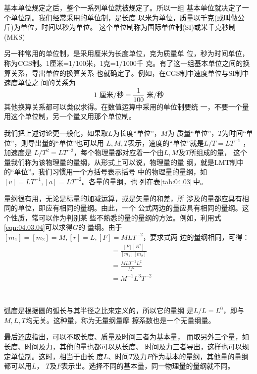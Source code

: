 基本单位规定之后，整个一系列单位就被规定了。所以一组
基本单位就决定了一个单位制。我们经常采用的单位制，是长度
以米为单位，质量以千克(或叫做公斤)为单位，时间以秒为单位。
这个单位制称为国际单位制(SI)或米千克秒制(MKS)

另一种常用的单位制，是采用厘米为长度单位，克为质量单
位，秒为时间单位，称为CGS制。1厘米=1/100米，1克=1/1000千
克。有了这一组基本单位之间的换算关系，导出单位的换算关系
也就确定了。例如，在CGS制中速度单位与SI制中速度单位之
间的关系为
\begin{equation*}
  1 \text{ 厘米/秒} = \frac { 1 } { 1 0 0 } \text{ 米/秒}
\end{equation*}
其他换算关系都可以类似求得。在数值运算中采用的单位制要统
\clearpage\noindent
一，不要一个量用这个单位制，另一个量又用那个单位制。

我们把上述讨论更一般化，如果取$ L $为长度“单位”，$ M $为
质量“单位”，$ T $为时间“单位”，则导出量的“单位”也可以用
$ L , M , T $表示，速度的“单位”就是$ L / T = L T ^ { - 1 } $ ，加速度是
$ L / T ^ { 2 } = L T ^ { - 2 } $，每个物理量都对应着一个由$ L , M $及$ T $所组成的量，
这个量我们称为该物理量的量纲，从形式上可以说，物理量的量
纲，就是LMT制中的“单位”。我们习惯用一个方括号表示括号
中的物理量的量纲，如$ [ v ] = L T ^ { - 1 } , [ a ] = L T ^ { - 2 }$。各量的量纲，也
列在表\ref{tab:04.03}\,中。

量纲很有用，无论是标量的加减运算，或是矢量的和差，所
涉及的量都应具有相同的单位，即应有相同的量纲。由此，一个
公式两边的量应具有相同的量纲。这个性质，常可以作为判别某
些不熟悉的量的量纲的方法。例如，利用式\eqref{eqn:04.03.04}可以求得$ G $的
量纲。由于$ [ m _ { 1 } ] = [ m _ { 2 } ] = M , [ r ] = L , [  F ] = M L T ^ { - 2 } $，要求式两
边的量纲相同，可得：
\begin{align*}
  [ G ] & = \frac { [ F ] [ R ^ 2] } { [ m _ { 1 } ] [ m _ { 2 } ] } \\
        & = \frac { M L T ^ { - 2 } L ^ { 2 } } { M ^ { 2 } }        \\
        & = M ^ { - 1 } L ^ { 3 } T ^ { - 2 }
\end{align*}

~ \vspace{-2em}

弧度是根据圆的弧长与其半径之比来定义的，所以它的量纲
是$ L / L = L ^ { 0 } $，即与$ M , L , T $均无关。这种量，称为无量纲量摩
擦系数也是一个无量纲量。

最后还应指出，可以不取长度、质量及时间三者为基本量，
而取另外三个量，如长度、时间及力，其他的量也都可以从长度、
时间及力三者导出，这样也可以规定单位制。这时，相当于由长
度$ L $、时间$ T $及力$ F $作为基本的量纲，其他量的量纲都可以用$ L $，
$ T $及$ F $表示出。选择不同的基本量，同一物理量的量纲就不同。
